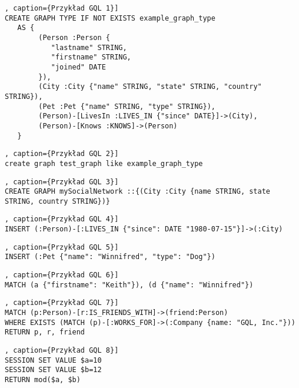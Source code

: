 
\begin{lstlisting}[style=gqlStyle, label={lst:wydajnosc-przyklad-p-1}], caption={Przykład GQL 1}]
CREATE GRAPH TYPE IF NOT EXISTS example_graph_type
   AS {
        (Person :Person {
           "lastname" STRING,
           "firstname" STRING,
           "joined" DATE
        }),
        (City :City {"name" STRING, "state" STRING, "country" STRING}),
        (Pet :Pet {"name" STRING, "type" STRING}),
        (Person)-[LivesIn :LIVES_IN {"since" DATE}]->(City),
        (Person)-[Knows :KNOWS]->(Person)
   }
\end{lstlisting}

\begin{lstlisting}[style=gqlStyle, label={lst:wydajnosc-przyklad-p-2}], caption={Przykład GQL 2}]
create graph test_graph like example_graph_type
\end{lstlisting}

\begin{lstlisting}[style=gqlStyle, label={lst:wydajnosc-przyklad-p-3}], caption={Przykład GQL 3}]
CREATE GRAPH mySocialNetwork ::{(City :City {name STRING, state STRING, country STRING})}
\end{lstlisting}

\begin{lstlisting}[style=gqlStyle, label={lst:wydajnosc-przyklad-p-4}], caption={Przykład GQL 4}]
INSERT (:Person)-[:LIVES_IN {"since": DATE "1980-07-15"}]->(:City)
\end{lstlisting}

\begin{lstlisting}[style=gqlStyle, label={lst:wydajnosc-przyklad-p-5}], caption={Przykład GQL 5}]
INSERT (:Pet {"name": "Winnifred", "type": "Dog"})
\end{lstlisting}

\begin{lstlisting}[style=gqlStyle, label={lst:wydajnosc-przyklad-p-6}], caption={Przykład GQL 6}]
MATCH (a {"firstname": "Keith"}), (d {"name": "Winnifred"})
\end{lstlisting}

\begin{lstlisting}[style=gqlStyle, label={lst:wydajnosc-przyklad-p-7}], caption={Przykład GQL 7}]
MATCH (p:Person)-[r:IS_FRIENDS_WITH]->(friend:Person)
WHERE EXISTS (MATCH (p)-[:WORKS_FOR]->(:Company {name: "GQL, Inc."}))
RETURN p, r, friend
\end{lstlisting}

\begin{lstlisting}[style=gqlStyle, label={lst:wydajnosc-przyklad-p-8}], caption={Przykład GQL 8}]
SESSION SET VALUE $a=10
SESSION SET VALUE $b=12
RETURN mod($a, $b)
\end{lstlisting}

